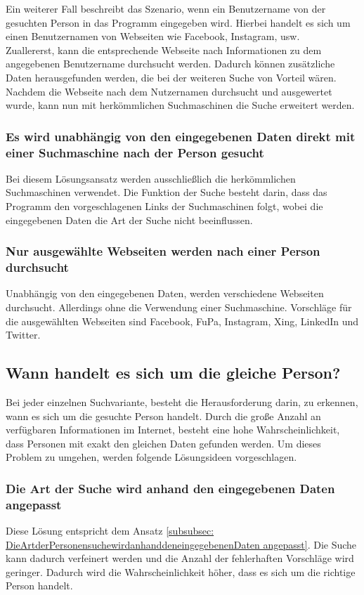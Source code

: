 		Ein weiterer Fall beschreibt das Szenario, wenn ein Benutzername von der gesuchten Person in das Programm eingegeben wird. Hierbei handelt es sich um einen Benutzernamen von Webseiten wie Facebook, Instagram, usw.\\
		Zuallererst, kann die entsprechende Webseite nach Informationen zu dem angegebenen Benutzername durchsucht werden. Dadurch können zusätzliche Daten herausgefunden werden, die bei der weiteren Suche von Vorteil wären. \\
		Nachdem die Webseite nach dem Nutzernamen durchsucht und ausgewertet wurde, kann nun mit herkömmlichen Suchmaschinen die Suche erweitert werden.
		\subsubsection{Es wird unabhängig von den eingegebenen Daten direkt mit einer Suchmaschine nach der Person gesucht}
		Bei diesem Lösungsansatz werden ausschließlich die herkömmlichen Suchmaschinen verwendet. Die Funktion der Suche besteht darin, dass das Programm den vorgeschlagenen Links der Suchmaschinen folgt, wobei die eingegebenen Daten die Art der Suche nicht beeinflussen.
		\subsubsection{Nur ausgewählte Webseiten werden nach einer Person durchsucht}
		Unabhängig von den eingegebenen Daten, werden verschiedene Webseiten durchsucht. Allerdings ohne die Verwendung einer Suchmaschine. Vorschläge für die ausgewählten Webseiten sind Facebook, FuPa, Instagram, Xing, LinkedIn und Twitter.
	
	\subsection{Wann handelt es sich um die gleiche Person?}
	Bei jeder einzelnen Suchvariante, besteht die Herausforderung darin, zu erkennen, wann es sich um die gesuchte Person handelt. Durch die große Anzahl an verfügbaren Informationen im Internet, besteht eine hohe Wahrscheinlichkeit, dass Personen mit exakt den gleichen Daten gefunden werden. Um dieses Problem zu umgehen, werden folgende Lösungsideen vorgeschlagen.
		\subsubsection{Die Art der Suche wird anhand den eingegebenen Daten angepasst}	Diese Lösung entspricht dem Ansatz \ref{subsubsec: DieArtderPersonensuchewirdanhanddeneingegebenenDaten angepasst}. Die Suche kann dadurch verfeinert werden und die Anzahl der fehlerhaften Vorschläge wird geringer. Dadurch wird die Wahrscheinlichkeit höher, dass es sich um die richtige Person handelt.

